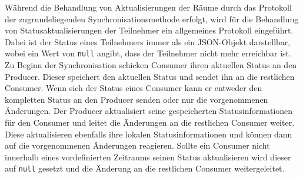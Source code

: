 Während die Behandlung von Aktualisierungen der Räume durch das Protokoll der zugrundeliegenden Synchronisationsmethode erfolgt, wird für die Behandlung von Statusaktualisierungen der Teilnehmer ein allgemeines Protokoll eingeführt. Dabei ist der Status eines Teilnehmers immer als ein JSON-Objekt darstellbar, wobei ein Wert von \texttt{null} angibt, dass der Teilnehmer nicht mehr erreichbar ist. Zu Beginn der Synchronisation schicken Consumer ihren aktuellen Status an den Producer. Dieser speichert den aktuellen Status und sendet ihn an die restlichen Consumer. Wenn sich der Status eines Consumer kann er entweder den kompletten Status an den Producer senden oder nur die vorgenommenen Änderungen. Der Producer aktualisiert seine gespeicherten Statusinformationen für den Consumer und leitet die Änderungen an die restlichen Consumer weiter. Diese aktualisieren ebenfalls ihre lokalen Statusinformationen und können dann auf die vorgenommenen Änderungen reagieren. Sollte ein Consumer nicht innerhalb eines vordefinierten Zeitraums seinen Status aktualisieren wird dieser auf \texttt{null} gesetzt und die Änderung an die restlichen Consumer weitergeleitet.